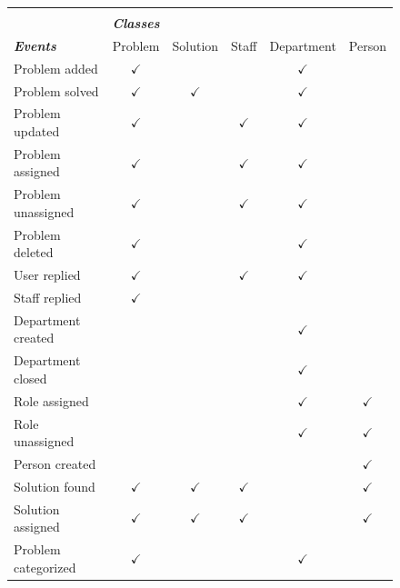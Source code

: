 \begin{figure}[]
\begin{tabular}{ l c c c c c} \hline
\\
&\emph{\textbf{Classes}} &  &  & &  \\ 
\emph{\textbf{Events}} & Problem & Solution & Staff & Department & Person \\ \hline
 Problem added 				& $ \checkmark $ &  &  & $ \checkmark $ &  \\ 
 Problem solved 			& $ \checkmark $ & $ \checkmark $ &  & $ \checkmark $ &  \\ 
 Problem updated 			& $ \checkmark $ &  & $ \checkmark $ & $ \checkmark $ &  \\ 
 Problem assigned 		& $ \checkmark $ &  & $ \checkmark $ & $ \checkmark $ &  \\ 
 Problem unassigned 	& $ \checkmark $ &  & $ \checkmark $ & $ \checkmark $ &  \\ 
 Problem deleted 			& $ \checkmark $ &  &  & $ \checkmark $ &  \\ 
 User replied 				& $ \checkmark $ &  & $ \checkmark $ & $ \checkmark $ &  \\ 
 Staff replied 				& $ \checkmark $ &  &  &  &  \\ 
 Department created 	&  &  &  & $ \checkmark $ &  \\ 
 Department closed 		&  &  &  & $ \checkmark $ &  \\ 
 Role assigned 				&  &  &  & $ \checkmark $ & $ \checkmark $  \\ 
 Role unassigned 			&  &  &  &  $ \checkmark $  & $ \checkmark $ \\ 
 Person created 			&  &  &  &  & $ \checkmark $ \\ 
 Solution found 			& $ \checkmark $ & $ \checkmark $ & $ \checkmark $ &  & $ \checkmark $ \\ 
 Solution assigned		& $ \checkmark $ & $ \checkmark $ & $ \checkmark $ &  & $ \checkmark $ \\ 
 Problem categorized	& $ \checkmark $ &  &  & $ \checkmark $ &  \\ \hline
\end{tabular}
\label{fig:classeseventstable}
\end{figure}

